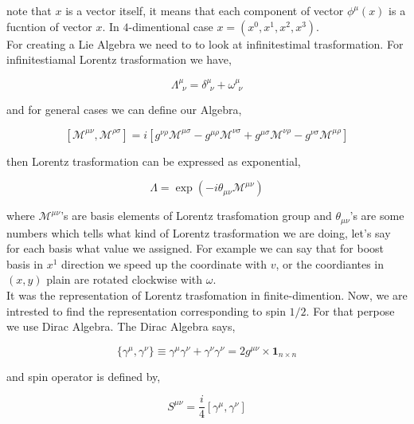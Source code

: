 note that $x$ is a vector itself, it means that each component of vector $\phi^{\mu}(x)$ is a fucntion of vector $x$. In $4$-dimentional case $x = (x^0,x^1,x^2,x^3)$.\\

For creating a Lie Algebra we need to to look at infinitestimal trasformation. For infinitestiamal Lorentz trasformation we have,

\begin{equation}
    \Lambda^{\mu}_{~~\nu} = \delta^{\mu}_{~~\nu} + \omega^{\mu}_{~~\nu}
\end{equation}

and for general cases we can define our Algebra,

\begin{equation} \label{eq:LorentzLieAlgebra}
   \left[\mathcal{M}^{\mu\nu} , \mathcal{M}^{\rho\sigma}\right] = i\left[g^{\nu\rho}\mathcal{M}^{\mu\sigma} - g^{\mu\rho}\mathcal{M}^{\nu\sigma} + g^{\mu\sigma}\mathcal{M}^{\nu\rho} - g^{\nu\sigma}\mathcal{M}^{\mu\rho} \right]
\end{equation}

then Lorentz trasformation can be expressed  as exponential,

\begin{equation}
   \Lambda = \exp{(-i\theta_{\mu\nu}\mathcal{M}^{\mu\nu})}
\end{equation}

where $\mathcal{M}^{\mu\nu}$'s are basis elements of Lorentz trasfomation group and $\theta_{\mu\nu}$'s are some numbers which tells what kind of Lorentz trasformation we are doing, let's say for each basis what value we assigned. For example we can say that for boost basis in $x^1$ direction we speed up the coordinate with $v$, or the coordiantes in $(x,y)$ plain are rotated clockwise with $\omega$.\\

It was the representation of Lorentz trasfomation in finite-dimention. Now, we are intrested to find the representation corresponding to spin $1/2$. For that perpose we use Dirac Algebra. The Dirac Algebra says,

\begin{equation} \label{eq:DiracAlgebra}
   \{\gamma^{\mu} , \gamma^{\nu}\} \equiv \gamma^{\mu}\gamma^{\nu} + \gamma^{\nu}\gamma^{\nu} = 2g^{\mu\nu} \times \mathbf{1}_{n\times n}
\end{equation}

and spin operator is defined by,

\begin{equation} \label{eq:SpinOperator}
   S^{\mu\nu} = \frac{i}{4}\left[ \gamma^{\mu} , \gamma^{\nu} \right]
\end{equation}

